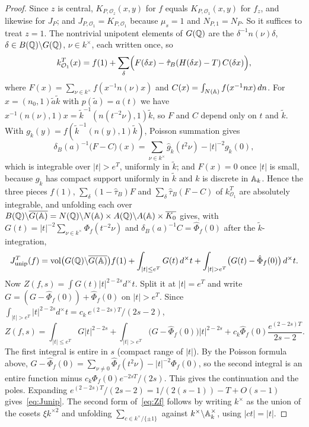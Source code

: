 \begin{proof}
Since $z$ is central, $K_{P,\mathcal O_z}(x,y)$ for $f$ equals
$K_{P,\mathcal O_1}(x,y)$ for $f_z$, and likewise for $J_P$; and
$J_{P,\mathcal O_1}=K_{P,\mathcal O_1}$ because $\mu_s=1$ and
$N_{P,1}=N_P$. So it suffices to treat $z=1$. The nontrivial unipotent
elements of $G(\mathbb{Q})$ are the $\delta^{-1}n(\nu)\delta$,
$\delta\in B(\mathbb{Q})\backslash G(\mathbb{Q})$, $\nu\in k^\times$, each written once,
so
\[
k^T_{\mathcal O_1}(x)=f(1)+\sum_{\delta}\Bigl(F(\delta x)
-\hat\tau_B(H(\delta x)-T)\,C(\delta x)\Bigr),
\]
where $F(x)=\sum_{\nu\in k^\times}f(x^{-1}n(\nu)x)$ and
$C(x)=\int_{N(\mathbb{A})}f(x^{-1}nx)\,dn$.
For $x=(n_0,1)\tilde a\tilde k$ with $p(\tilde a)=a(t)$ we have
$x^{-1}(n(\nu),1)x=\tilde k^{-1}(n(t^{-2}\nu),1)\tilde k$, so $F$ and $C$
depend only on $t$ and $\tilde k$. With $g_{\tilde k}(y)=
f(\tilde k^{-1}(n(y),1)\tilde k)$, Poisson summation gives
\[
\delta_B(a)^{-1}\bigl(F-C\bigr)(x)=\sum_{\nu\in k^\times}
\hat g_{\tilde k}(t^2\nu)-|t|^{-2}g_{\tilde k}(0),
\]
which is integrable over $|t|>e^T$, uniformly in $\tilde k$; and
$F(x)=0$ once $|t|$ is small, because $g_{\tilde k}$ has compact support
uniformly in $\tilde k$ and $k$ is discrete in $\mathbb{A}_k$. Hence the
three pieces $f(1)$, $\sum_\delta(1-\hat\tau_B)F$ and
$\sum_\delta\hat\tau_B(F-C)$ of $k^T_{\mathcal O_1}$ are absolutely
integrable, and unfolding each over $B(\mathbb{Q})\backslash\overline{G(\mathbb{A})}=N(\mathbb{Q})\backslash
N(\mathbb{A})\times A(\mathbb{Q})\backslash A(\mathbb{A})\times\overline{K_0}$ gives, with
$G(t)=|t|^{-2}\sum_{\nu\in k^\times}\Phi_f(t^{-2}\nu)$ and
$\delta_B(a)^{-1}C=\hat\Phi_f(0)$ after the $\tilde k$-integration,
\[
J^T_{\mathrm{unip}}(f)=\vol\bigl(G(\Q)\backslash\GA\bigr)f(1)
+\int_{|t|\le e^T}G(t)\,d^\times t+\int_{|t|>e^T}\bigl(G(t)-\hat\Phi_f(0)
\bigr)\,d^\times t.
\]
Now $Z(f,s)=\int G(t)|t|^{2-2s}d^\times t$. Split it at $|t|=e^T$ and
write $G=(G-\hat\Phi_f(0))+\hat\Phi_f(0)$ on $|t|>e^T$. Since
$\int_{|t|>e^T}|t|^{2-2s}d^\times t=c_k\,e^{(2-2s)T}/(2s-2)$,
\[
Z(f,s)=\int_{|t|\le e^T}G|t|^{2-2s}+\int_{|t|>e^T}\bigl(G-\hat\Phi_f(0)
\bigr)|t|^{2-2s}+c_k\hat\Phi_f(0)\frac{e^{(2-2s)T}}{2s-2}.
\]
The first integral is entire in $s$ (compact range of $|t|$). By the
Poisson formula above, $G-\hat\Phi_f(0)=\sum_{\nu\ne0}\hat\Phi_f(t^2\nu)
-|t|^{-2}\Phi_f(0)$, so the second integral is an entire function minus
$c_k\Phi_f(0)e^{-2sT}/(2s)$. This gives the continuation and the poles.
Expanding $e^{(2-2s)T}/(2s-2)=1/(2(s-1))-T+O(s-1)$ gives~\eqref{eq:Junip}.
The second form of~\eqref{eq:Zf} follows by writing $k^\times$ as the
union of the cosets $\xi k^{\times2}$ and unfolding
$\sum_{c\in k^\times/\{\pm1\}}$ against $k^\times\backslash\mathbb{A}_k^\times$,
using $|ct|=|t|$.
\end{proof}

